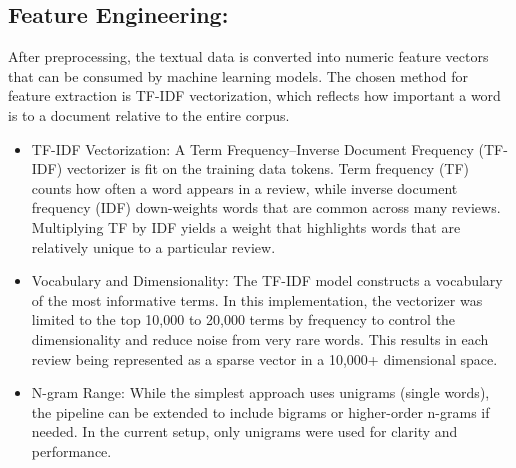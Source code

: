 \documentclass{article}
\begin{document}
\subsection{Feature Engineering:}
After preprocessing, the textual data is converted into numeric feature vectors that can be consumed by machine learning models. The chosen method for feature extraction is TF-IDF vectorization, which reflects how important a word is to a document relative to the entire corpus.
\begin{itemize}
\item TF-IDF Vectorization: A Term Frequency–Inverse Document Frequency (TF-IDF) vectorizer is fit on the training data tokens. Term frequency (TF) counts how often a word appears in a review, while inverse document frequency (IDF) down-weights words that are common across many reviews. Multiplying TF by IDF yields a weight that highlights words that are relatively unique to a particular review.
\item Vocabulary and Dimensionality: The TF-IDF model constructs a vocabulary of the most informative terms. In this implementation, the vectorizer was limited to the top 10,000 to 20,000 terms by frequency to control the dimensionality and reduce noise from very rare words. This results in each review being represented as a sparse vector in a 10,000+ dimensional space.
\item N-gram Range: While the simplest approach uses unigrams (single words), the pipeline can be extended to include bigrams or higher-order n-grams if needed. In the current setup, only unigrams were used for clarity and performance.
\end{itemize}

\newpage
\end{document}
